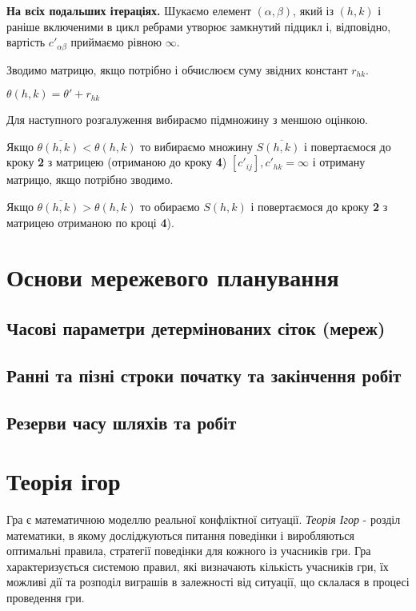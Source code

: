 \documentclass[12pt,a4paper]{book}
\newenvironment{slim_enumerate}{
\begin{enumerate}
  \setlength{\itemsep}{1pt}
  \setlength{\parskip}{0pt}
  \setlength{\parsep}{0pt}}
{\end{enumerate}}
\begin{document}
\begin{slim_enumerate}
\begin{slim_enumerate}
\begin{slim_enumerate}
{\bf На всіх подальших ітераціях.} Шукаємо елемент $(\alpha, \beta)$, який із $(h,k)$ і раніше включеними в цикл ребрами утворює замкнутий підцикл і, відповідно, вартість $c'_{\alpha \beta}$ приймаємо рівною $\infty$.

      \item Зводимо матрицю, якщо потрібно і обчислюєм суму звідних констант $r_{h k}$.
      \item $ \theta(h,k) = \theta' + r_{h k} $
    \end{slim_enumerate}
  \end{slim_enumerate}
  \item Для наступного розгалуження вибираємо підмножину з меншою оцінкою.
  \begin{slim_enumerate}
    \item Якщо $\theta\overline{(h,k)} < \theta(h,k)$ то вибираємо множину $S\overline{(h,k)}$ і повертаємося до кроку {\bf 2} з матрицею (отриманою до кроку {\bf 4}) $[c'_{ij}], c'_{h k}=\infty$ і отриману матрицю, якщо потрібно зводимо.
    \item Якщо $\theta\overline{(h,k)} > \theta(h,k)$ то обираємо $S(h,k)$ і повертаємося до кроку {\bf 2} з матрицею отриманою по кроці {\bf 4}).
  \end{slim_enumerate}
\end{slim_enumerate}

\chapter{Основи мережевого планування}
\section{Часові параметри детермінованих сіток (мереж)}
\section{Ранні та пізні строки початку та закінчення робіт}
\section{Резерви часу шляхів та робіт}

\chapter{Теорія ігор}

Гра є математичною моделлю реальної конфліктної ситуації. \emph{Теорія Ігор} - розділ математики, в якому досліджуються питання поведінки і виробляються оптимальні правила, стратегії поведінки для кожного із учасників гри. Гра характеризується системою правил, які визначають кількість учасників гри, їх можливі дії та розподіл виграшів в залежності від ситуації, що склалася в процесі проведення гри.
\end{document}
